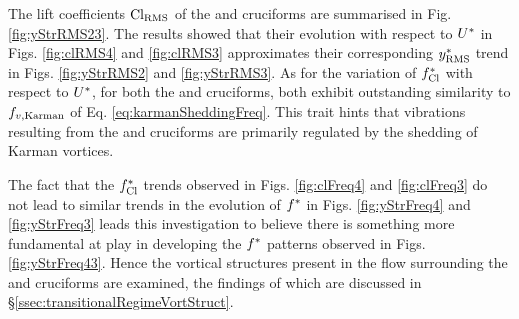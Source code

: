 \documentclass[oneside]{utmthesis}
\begin{document}
The \rms{} lift coefficients $\text{Cl}_{\text{RMS}}$ of the \angfo{} and \angth{} cruciforms are summarised in Fig. \ref{fig:yStrRMS23}. The results showed that their evolution with respect to $U^{*}$ in Figs. \ref{fig:clRMS4} and \ref{fig:clRMS3} approximates their corresponding $y^{*}_{\text{RMS}}$ trend in Figs. \ref{fig:yStrRMS2} and \ref{fig:yStrRMS3}. As for the variation of $f_{\text{Cl}}^{*}$ with respect to $U^{*}$, for both the \angfo{} and \angth{} cruciforms, both exhibit outstanding similarity to $f_{v,\text{Karman}}$ of Eq. \ref{eq:karmanSheddingFreq}. This trait hints that vibrations resulting from the \angfo{} and \angth{} cruciforms are primarily regulated by the shedding of Karman vortices.

The fact that the $f_{\text{Cl}}^{*}$ trends observed in Figs. \ref{fig:clFreq4} and \ref{fig:clFreq3} do not lead to similar trends in the evolution of $f^{*}$ in Figs. \ref{fig:yStrFreq4} and \ref{fig:yStrFreq3} leads this investigation to believe there is something more fundamental at play in developing the $f^{*}$ patterns observed in Figs. \ref{fig:yStrFreq43}. Hence the vortical structures present in the flow surrounding the \angfo{} and \angth{} cruciforms are examined, the findings of which are discussed in \S\ref{ssec:transitionalRegimeVortStruct}. 
\end{document}
